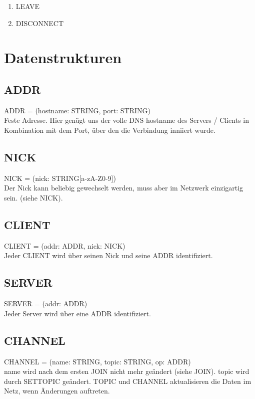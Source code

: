 \documentclass{article}
\begin{document}
\begin{enumerate}
  \item LEAVE
  \item DISCONNECT
\end{enumerate}


\section{Datenstrukturen}

\subsection{ADDR}

ADDR = (hostname: STRING, port: STRING)\\
Feste Adresse. Hier genügt uns der volle DNS hostname des Servers / Clients in Kombination mit dem Port, über den die Verbindung inniiert wurde.

\subsection{NICK}

NICK = (nick: STRING[a-zA-Z0-9])\\
Der Nick kann beliebig gewechselt werden, muss aber im Netzwerk einzigartig sein. (siehe NICK).

\subsection{CLIENT}

CLIENT = (addr: ADDR, nick: NICK)\\
Jeder CLIENT wird über seinen Nick und seine ADDR identifiziert. 

\subsection{SERVER}

SERVER = (addr: ADDR)\\
Jeder Server wird über eine ADDR identifiziert.

\subsection{CHANNEL}

CHANNEL = (name: STRING, topic: STRING, op: ADDR)\\
name wird nach dem ersten JOIN nicht mehr geändert (siehe JOIN). topic wird durch SETTOPIC geändert. TOPIC und CHANNEL aktualisieren die Daten im Netz, wenn Änderungen auftreten.
\end{document}
